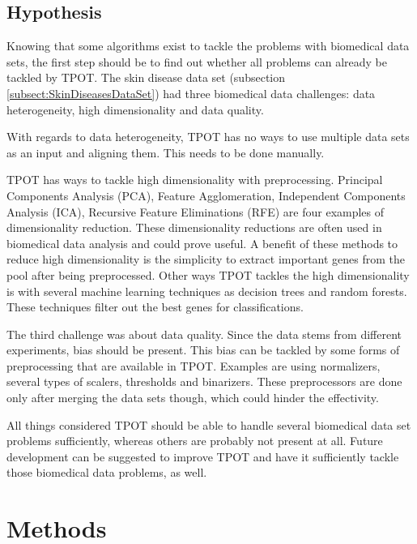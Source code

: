 \documentclass[10pt,a4paper]{article}
\begin{document}
	\subsection{Hypothesis}
	\label{subsec:Hypothesis}
	
	Knowing that some algorithms exist to tackle the problems with biomedical data sets, the first step should be to find out whether all problems can already be tackled by TPOT. The skin disease data set (subsection \ref{subsect:SkinDiseasesDataSet}) had three biomedical data challenges: data heterogeneity, high dimensionality and data quality. 

	With regards to data heterogeneity, TPOT has no ways to use multiple data sets as an input and aligning them. This needs to be done manually. 
	
	TPOT has ways to tackle high dimensionality with preprocessing. Principal Components Analysis (PCA), Feature Agglomeration, Independent Components Analysis (ICA), Recursive Feature Eliminations (RFE) are four examples of dimensionality reduction. These dimensionality reductions are often used in biomedical data analysis and could prove useful. A benefit of these methods to reduce high dimensionality is the simplicity to extract important genes from the pool after being preprocessed. Other ways TPOT tackles the high dimensionality is with several machine learning techniques as decision trees and random forests. These techniques filter out the best genes for classifications.
	
	The third challenge was about data quality. Since the data stems from different experiments, bias should be present. This bias can be tackled by some forms of preprocessing that are available in TPOT. Examples are using normalizers, several types of scalers, thresholds and binarizers. These preprocessors are done only after merging the data sets though, which could hinder the effectivity.
	
	All things considered TPOT should be able to handle several biomedical data set problems sufficiently, whereas others are probably not present at all. Future development can be suggested to improve TPOT and have it sufficiently tackle those biomedical data problems, as well.
	
	\section{Methods}
	\label{sec:Methods}
	
\end{document}
